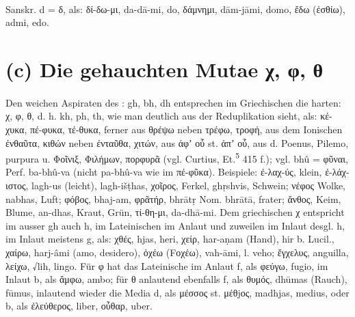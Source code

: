 \paragraph{} Sanskr.  d =  δ, als: δί-δω-μι,  da-dā-mi,  do,
δάμνημι,  dām-jāmi,  domo, ἔδω (ἐσθίω),  admi,  edo.

\section{(c) Die gehauchten Mutae χ, φ, θ}


\paragraph{} Den weichen Aspiraten des : gh, bh, dh entsprechen im
Griechischen die harten: χ, φ, θ, d. h. kh, ph, th, wie man deutlich aus der
Reduplikation sieht, als: κέ-χυκα, πέ-φυκα, τέ-θυκα, ferner aus θρέψω neben
τρέφω, τροφή, aus dem Ionischen ἐνθαῦτα, κιθών neben ἐνταῦθα, χιτών, aus ἀφʼ οὗ
st. ἀπʼ οὗ, aus d.  Poenus, Pilemo, purpura u. Φοῖνιξ, Φιλήμων, πορφυρᾶ
(vgl. Curtius, Et.\textsuperscript{5} 415 f.); vgl.  bhû = φῦναι, Perf.
ba-bhû-va (nicht pa-bhû-va wie im  πέ-φῦκα). Beispiele: ἐ-λαχ-ύς, klein,
ἐ-λάχ-ιστος,  lagh-us (leicht), lagh-išṭhas, χοῖρος, Ferkel, 
ghṛshvis, Schwein; νέφος Wolke,  nabhas, Luft; φόβος,  bhaj-am, φρᾶτήρ,
 bhrātṛ Nom. bhrātā,  frater; ἄνθος, Keim, Blume,  an-dhas, Kraut, Grün,
τί-θη-μι,  da-dhā-mi. Dem griechischen χ entspricht im  ausser gh
auch h, im Lateinischen im Anlaut und zuweilen im Inlaut desgl. h, im Inlaut
meistens g, als: χθές,  hjas,  heri, χείρ,  har-aṇam (Hand),  hir
b. Lucil., χαίρω,  harj-âmi (amo, desidero), ὀχέω (Fοχέω),  vah-āmi, l.
veho; ἔγχελυς,  anguilla, λείχω,  √lih,  lingo. Für φ hat das
Lateinische im Anlaut f, als φεύγω, fugio, im Inlaut b, als ἄμφω, ambo; für θ
anlautend ebenfalls f, als θυμός,  dhūmas (Rauch),  fūmus, inlautend
wieder die Media d, als μέσσος st. μέθjος,  madhjas,  medius, oder b, als
ἐλεύθερος, liber, οὖθαρ, uber. 

